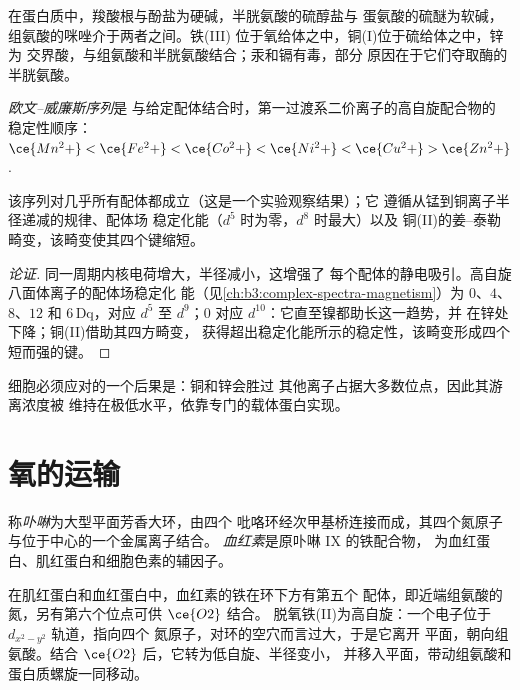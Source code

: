 在蛋白质中，羧酸根与酚盐为硬碱，半胱氨酸的硫醇盐与
蛋氨酸的硫醚为软碱，组氨酸的咪唑介于两者之间。铁(III)
位于氧给体之中，铜(I)位于硫给体之中，锌为
交界酸，与组氨酸和半胱氨酸结合；汞和镉有毒，部分
原因在于它们夺取酶的半胱氨酸。

\begin{definition}[欧文–威廉斯序列]\label{def:b3:bioinorganic:irving-williams}
\emph{欧文–威廉斯序列}是
与给定配体结合时，第一过渡系二价离子的高自旋配合物的
稳定性顺序：
$\ce{Mn^2+} < \ce{Fe^2+} < \ce{Co^2+} < \ce{Ni^2+} < \ce{Cu^2+} > \ce{Zn^2+}$.
\end{definition}

\begin{proposition}[欧文–威廉斯顺序]\label{prop:b3:bioinorganic:irving-williams}
该序列对几乎所有配体都成立（这是一个实验观察结果）；它
遵循从锰到铜离子半径递减的规律、配体场
稳定化能（$d^5$ 时为零，$d^8$ 时最大）以及
铜(II)的姜–泰勒畸变，该畸变使其四个键缩短。
\end{proposition}

\begin{proof}[论证]
同一周期内核电荷增大，半径减小，这增强了
每个配体的静电吸引。高自旋八面体离子的配体场稳定化
能（见\cref{ch:b3:complex-spectra-magnetism}）为 $0$、$4$、
$8$、$12$ 和 $6\,\mathrm{Dq}$，对应 $d^5$ 至 $d^9$；$0$ 对应 $d^{10}$：它直至镍都助长这一趋势，并
在锌处下降；铜(II)借助其四方畸变，
获得超出稳定化能所示的稳定性，该畸变形成四个短而强的键。
\end{proof}

细胞必须应对的一个后果是：铜和锌会胜过
其他离子占据大多数位点，因此其游离浓度被
维持在极低水平，依靠专门的载体蛋白实现。

\section{氧的运输}

\begin{definition}[卟啉与血红素]\label{def:b3:bioinorganic:haem}
称\emph{卟啉}为大型平面芳香大环，由四个
吡咯环经次甲基桥连接而成，其四个氮原子与位于中心的一个金属离子结合。
\emph{血红素}是原卟啉 IX 的铁配合物，
为血红蛋白、肌红蛋白和细胞色素的辅因子。
\end{definition}

在肌红蛋白和血红蛋白中，血红素的铁在环下方有第五个
配体，即近端组氨酸的氮，另有第六个位点可供 $\ce{O2}$ 结合。
脱氧铁(II)为高自旋：一个电子位于 $d_{x^2-y^2}$ 轨道，指向四个
氮原子，对环的空穴而言过大，于是它离开
平面，朝向组氨酸。结合 $\ce{O2}$ 后，它转为低自旋、半径变小，
并移入平面，带动组氨酸和蛋白质螺旋一同移动。


